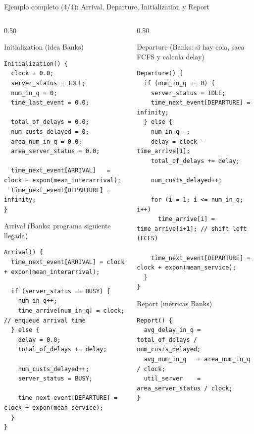 \documentclass[aspectratio=1610, 9pt]{beamer}
\begin{document}
\begin{frame}[fragile]{Ejemplo completo (4/4): Arrival, Departure, Initialization y Report }
\scriptsize
\begin{columns}[T,totalwidth=\textwidth]
\begin{column}{0.50\textwidth}
\begin{block}{Initialization (idea Banks)}
\end{block}
\begin{verbatim}
Initialization() {
  clock = 0.0;
  server_status = IDLE;
  num_in_q = 0;
  time_last_event = 0.0;

  total_of_delays = 0.0;
  num_custs_delayed = 0;
  area_num_in_q = 0.0;
  area_server_status = 0.0;

  time_next_event[ARRIVAL]   = clock + expon(mean_interarrival);
  time_next_event[DEPARTURE] = infinity;
}
\end{verbatim}

\begin{block}{Arrival (Banks: programa siguiente llegada)}
\end{block}
\begin{verbatim}
Arrival() {
  time_next_event[ARRIVAL] = clock + expon(mean_interarrival);

  if (server_status == BUSY) {
    num_in_q++;
    time_arrive[num_in_q] = clock;       // enqueue arrival time
  } else {
    delay = 0.0;
    total_of_delays += delay;

    num_custs_delayed++;
    server_status = BUSY;

    time_next_event[DEPARTURE] = clock + expon(mean_service);
  }
}
\end{verbatim}
\end{column}

\begin{column}{0.50\textwidth}
\begin{block}{Departure (Banks: si hay cola, saca FCFS y calcula delay)}
\end{block}
\begin{verbatim}
Departure() {
  if (num_in_q == 0) {
    server_status = IDLE;
    time_next_event[DEPARTURE] = infinity;
  } else {
    num_in_q--;
    delay = clock - time_arrive[1];
    total_of_delays += delay;

    num_custs_delayed++;

    for (i = 1; i <= num_in_q; i++)
      time_arrive[i] = time_arrive[i+1]; // shift left (FCFS)

    time_next_event[DEPARTURE] = clock + expon(mean_service);
  }
}
\end{verbatim}

\begin{block}{Report (métricas Banks)}
\end{block}
\begin{verbatim}
Report() {
  avg_delay_in_q = total_of_delays / num_custs_delayed;
  avg_num_in_q   = area_num_in_q / clock;
  util_server    = area_server_status / clock;
}
\end{verbatim}
\end{column}
\end{columns}
\end{frame}
\end{document}
